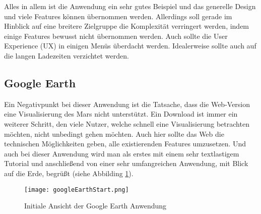 Alles in allem ist die Anwendung ein sehr gutes Beispiel und das generelle Design und viele Features können übernommen werden. Allerdings soll gerade im Hinblick auf eine breitere Zielgruppe die Komplexität verringert werden, indem einige Features bewusst nicht übernommen werden. Auch sollte die User Experience (UX) in einigen Menüs überdacht werden. Idealerweise sollte auch auf die langen Ladezeiten verzichtet werden.

\subsection{Google Earth}
Ein Negativpunkt bei dieser Anwendung ist die Tatsache, dass die Web-Version eine Visualisierung des Mars nicht unterstützt. Ein Download ist immer ein weiterer Schritt, den viele Nutzer, welche schnell eine Visualisierung betrachten möchten, nicht unbedingt gehen möchten. Auch hier sollte das Web die technischen Möglichkeiten geben, alle existierenden Features umzusetzen. Und auch bei dieser Anwendung wird man als erstes mit einem sehr textlastigem Tutorial und anschließend von einer sehr umfangreichen Anwendung, mit Blick auf die Erde, begrüßt (siehe Abbilding \ref{googleEarthStart}).

\begin{figure}[H]
  \texttt{[image: googleEarthStart.png]}
  \caption{Initiale Ansicht der Google Earth Anwendung}
  \label{googleEarthStart}
\end{figure}

